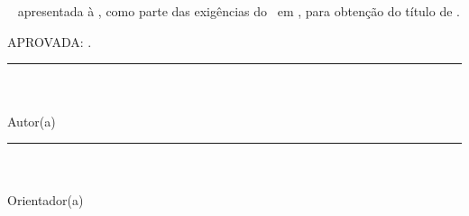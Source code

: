 \newpage
\thispagestyle{empty}
\begin{spacing}{1}
\begin{center}
{\MakeUppercase{\textbf{\nome}} \\ }

\vspace*{4.2cm}
{\MakeUppercase{\textbf{\titulo}} \\ }
\end{center}

\vspace*{2.6cm}
\singlespacing
\begin{flushright}
\begin{minipage}{7.8cm}
\fontcapa
{\tipo~ apresentada à \instituicao, como parte
  das exigências do \programa~em \curso, para
  obtenção do título de \textit{\titulop}.
} 

\end{minipage}
\end{flushright}
\vspace*{1.3cm}
%
%
APROVADA: \aprovacao.
\vspace*{4.3cm}
\begin{center}
\begin{minipage}{8.5cm}
{\begin{center}
\rule{\linewidth}{0.1mm} \\
{\nome}\\%
Autor(a)
\end{center}
}

\end{minipage}
\vfill
\begin{minipage}{8.5cm}
{\begin{center}
\rule{\linewidth}{0.1mm} \\
{\orientador}\\%
Orientador(a)
\end{center}}
\end{minipage}
\end{center}

\end{spacing}
